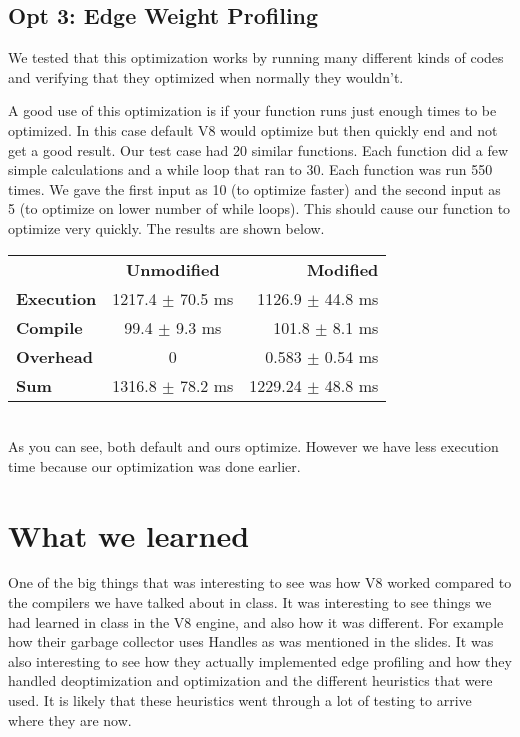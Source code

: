 \documentclass[twocolumn,showpacs,%
  nofootinbib,aps,superscriptaddress,%
  eqsecnum,prd,notitlepage,showkeys,10pt]{revtex4-1}
\begin{document}
\subsection{Opt 3: Edge Weight Profiling}
We tested that this optimization works by running many different kinds of codes and verifying that they optimized when normally they wouldn't. 

A good use of this optimization is if your function runs just enough times to be optimized. In this case default V8 would optimize but then quickly end and not get a good result. Our test case had 20 similar functions. Each function did a few simple calculations and a while loop that ran to 30. Each function was run 550 times. We gave the first input as 10 (to optimize faster) and the second input as 5 (to optimize on lower number of while loops). This should cause our function to optimize very quickly. The results are shown below.

\begin{tabular}{ l c r }
  & \textbf{Unmodified} & \textbf{Modified} \\
\textbf{Execution} &  1217.4  $\pm$  70.5 ms &  1126.9  $\pm$  44.8 ms \\
\textbf{Compile} & 99.4  $\pm$  9.3 ms & 101.8  $\pm$  8.1 ms \\
\textbf{Overhead} &  0   &   0.583  $\pm$  0.54 ms  \\
\textbf{Sum} & 1316.8  $\pm$  78.2 ms & 1229.24  $\pm$  48.8 ms \\
\end{tabular}\\

As you can see, both default and ours optimize. However we have less execution time because our optimization was done earlier.




\section{What we learned}
One of the big things that was interesting to see was how V8 worked compared to the compilers we have talked about in class. It was interesting to see things we had learned in class in the V8 engine, and also how it was different. For example how their garbage collector uses Handles as was mentioned in the slides. It was also interesting to see how they actually implemented edge profiling and how they handled deoptimization and optimization and the different heuristics that were used. It is likely that these heuristics went through a lot of testing to arrive where they are now.
\end{document}
